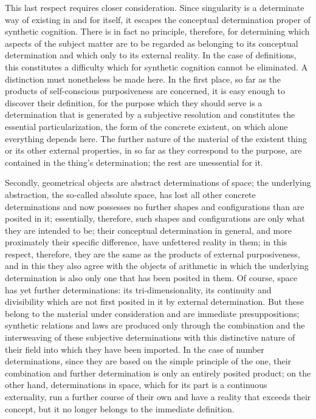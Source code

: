 This last respect requires closer consideration.
Since singularity is a determinate
way of existing in and for itself,
it escapes the conceptual determination
proper of synthetic cognition.
There is in fact no principle, therefore,
for determining which aspects of the subject matter are
to be regarded as belonging to its conceptual determination
and which only to its external reality.
In the case of definitions, this constitutes a difficulty
which for synthetic cognition cannot be eliminated.
A distinction must nonetheless be made here.
In the first place, so far as the products of
self-conscious purposiveness are concerned,
it is easy enough to discover their definition,
for the purpose which they should serve is
a determination that is generated by a subjective resolution
and constitutes the essential particularization,
the form of the concrete existent,
on which alone everything depends here.
The further nature of the material of
the existent thing or its other external properties,
in so far as they correspond to the purpose,
are contained in the thing's determination;
the rest are unessential for it.

Secondly, geometrical objects are abstract determinations of space;
the underlying abstraction, the so-called absolute space,
has lost all other concrete determinations
and now possesses no further shapes and configurations
than are posited in it;
essentially, therefore, such shapes and configurations are
only what they are intended to be;
their conceptual determination in general,
and more proximately their specific difference,
have unfettered reality in them;
in this respect, therefore, they are the same as
the products of external purposiveness,
and in this they also agree with
the objects of arithmetic in which
the underlying determination is also
only one that has been posited in them.
Of course, space has yet further determinations:
its tri-dimensionality, its continuity and divisibility which
are not first posited in it by external determination.
But these belong to the material under consideration
and are immediate presuppositions;
synthetic relations and laws are produced only
through the combination and the interweaving of
these subjective determinations with
this distinctive nature of their field
into which they have been imported.
In the case of number determinations,
since they are based on the simple principle of the one,
their combination and further determination is
only an entirely posited product;
on the other hand, determinations in space,
which for its part is a continuous externality,
run a further course of their own
and have a reality that exceeds their concept,
but it no longer belongs to the immediate definition.

